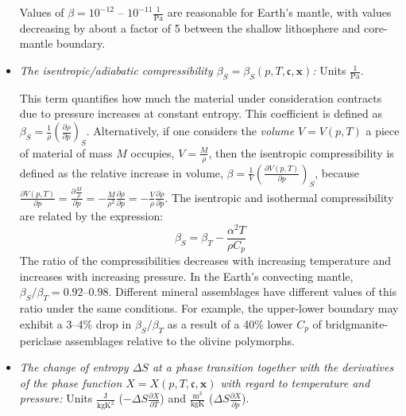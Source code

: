 \documentclass{article}
\begin{document}
\begin{itemize}
   Values of $\beta=10^{-12}$ -- $10^{-11} \frac{1}{\textrm{Pa}}$
   are reasonable for Earth's mantle, with values decreasing by about a factor of 5 between the shallow lithosphere and core-mantle boundary.

\item \textit{The isentropic/adiabatic compressibility $\beta_S=\beta_S(p,T,\mathfrak c ,\mathbf x)$:} Units
  $\frac{1}{\textrm{Pa}}$.

  This term quantifies how much the material under consideration
  contracts due to pressure increases at constant entropy.
  This coefficient is defined as
  $\beta_S = \frac{1}{\rho} \left( \frac{\partial \rho}{\partial p} \right)_{S}$.
  Alternatively, if
  one considers the \textit{volume} $V=V(p, T)$ a piece of material of mass $M$
  occupies, $V=\frac{M}{\rho}$, then the isentropic compressibility
  is defined as the relative increase in volume,
  $\beta=\frac{1}{V}\left(\frac{\partial V(p, T)}{\partial p}\right)_{S}$, because 
  $\frac{\partial V(p, T)}{\partial p} =
   \frac{\partial \frac{M}{\rho}}{\partial p} =
   -\frac{M}{\rho^2} \frac{\partial \rho}{\partial p} =
   -\frac{V}{\rho} \frac{\partial \rho}{\partial p}$.
   The isentropic and isothermal compressibility are related by the expression:
   \begin{equation}
     \beta_S = \beta_T - \frac{\alpha^2 T}{\rho C_p}
   \end{equation}
   The ratio of the compressibilities decreases with increasing temperature
   and increases with increasing pressure. In the Earth's convecting mantle,
   $\beta_S/\beta_T = 0.92$--$0.98$. Different mineral assemblages have
   different values of this ratio under the same conditions. For example, the
   upper-lower boundary may exhibit a 3--4\% drop in $\beta_S / \beta_T$
   as a result of a 40\% lower $C_p$ of bridgmanite-periclase assemblages
   relative to the olivine polymorphs.
   
   
\item \textit{The change of entropy $\Delta S$ at a
  phase transition together with the derivatives of the phase function
  $X=X(p,T,\mathfrak c,\mathbf x)$ with regard to temperature and pressure:} Units
  $\frac{\textrm{J}}{\textrm{kg}\textrm{K}^2}$ ($-\Delta S \frac{\partial X}{\partial T}$) and
  $\frac{\textrm{m}^3}{\textrm{kg}\textrm{K}}$ ($\Delta S \frac{\partial X}{\partial p}$).


\end{itemize}
\end{document}
